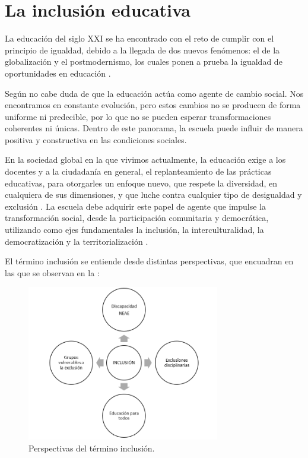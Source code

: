 \documentclass[spanish]{textolivre}
\begin{document}
\section{La inclusión educativa}
La educación del siglo XXI se ha encontrado con el reto de cumplir con el principio de igualdad, debido a la llegada de dos nuevos fenómenos: el de la globalización y el postmodernismo, los cuales ponen a prueba la igualdad de oportunidades en educación \cite{garciapedraza2015}.

Según \textcite{reales2005} no cabe duda de que la educación actúa como agente de cambio social. Nos encontramos en constante evolución, pero estos cambios no se producen de forma uniforme ni predecible, por lo que no se pueden esperar transformaciones coherentes ni únicas. Dentro de este panorama, la escuela puede influir de manera positiva y constructiva en las condiciones sociales.

En la sociedad global en la que vivimos actualmente, la educación exige a los docentes y a la ciudadanía en general, el replanteamiento de las prácticas educativas, para otorgarles  un enfoque nuevo, que respete la diversidad, en cualquiera de sus dimensiones, y que luche contra cualquier tipo de desigualdad y exclusión \cite{carmona-santiago2019}. La escuela debe adquirir este papel de agente que impulse la transformación social, desde la participación comunitaria y democrática, utilizando como ejes fundamentales la inclusión, la interculturalidad, la democratización y la territorialización \cite{salesciges2019}.

El término inclusión se entiende desde distintas perspectivas, que \textcite{caberoalmenara2017} encuadran en las que se observan en la :

\begin{figure}[htbp]
 \centering
 \includegraphics[width=0.75\textwidth]{imagem1.png}
 \caption{Perspectivas del término inclusión.}
 \label{fig1}
\end{figure}
\end{document}
